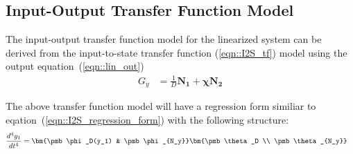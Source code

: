 \subsection{Input-Output Transfer Function Model}
The input-output transfer function model for the linearized system can be
derived from the input-to-state transfer function (\ref{eqn::I2S_tf}) model
using the output equation~(\ref{eqn::lin_out})
\begin{align}
    G_y &= \frac{1}{D} \bm{N_1 + \chi N_2}  \label{eqn::I2O_tf}
\end{align}

The above transfer function model will have a regression form similiar to
eqation~(\ref{eqn::I2S_regression_form}) with the following structure:
\begin{align} \label{eqn::I2O_regression_form}
    \frac{d^4 y_1}{dt^4} &= \bm{\pmb \phi_D(y_1) & \pmb \phi_{N_y}} \bm{\pmb \theta_D \\ \pmb \theta_{N_y}}
\end{align}

